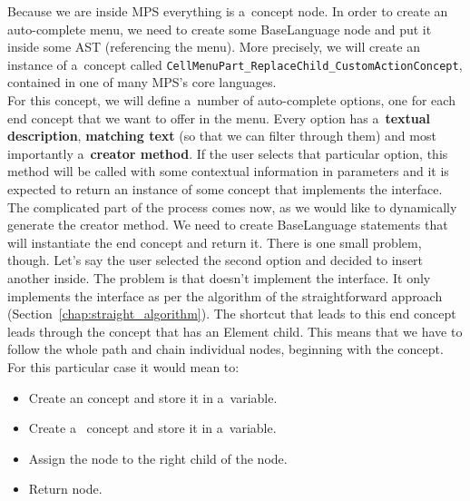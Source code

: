 Because we are inside MPS everything is a~concept node.
In order to create an auto-complete menu, we need to create some BaseLanguage node and put it inside some AST (referencing the menu).
More precisely, we will create an instance of a~concept called \texttt{CellMenuPart{\_}ReplaceChild{\_}CustomActionConcept}, contained in one of many MPS's core languages.
\\

For this concept, we will define a~number of auto-complete options, one for each end concept that we want to offer in the menu.
Every option has a~\textbf{textual description}, \textbf{matching text} (so that we can filter through them) and most importantly a~\textbf{creator method}.
If the user selects that particular option, this method will be called with some contextual information in parameters and it is expected to return an instance of some concept that implements the  interface.
\\

The complicated part of the process comes now, as we would like to dynamically generate the creator method.
We need to create BaseLanguage statements that will instantiate the end concept and return it.
There is one small problem, though.
Let's say the user selected the second option and decided to insert another  inside.
The problem is that  doesn't implement the  interface.
It only implements the  interface as per the algorithm of the straightforward approach (Section~\ref{chap:straight_algorithm}).
The shortcut that leads to this end concept leads through the  concept that has an Element child.
This means that we have to follow the whole path and chain individual nodes, beginning with the  concept.
For this particular case it would mean to:

\begin{itemize}
	\item Create an  concept and store it in a~variable.

	\item Create a~ concept and store it in a~variable.

	\item Assign the  node to the right child of the  node.

	\item Return  node.
\end{itemize}

